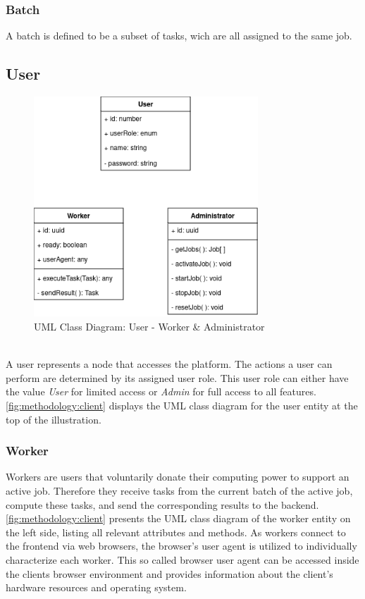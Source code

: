 \subsubsection{Batch}
\label{ssubsec:methodology:entities:task:batch}
A batch is defined to be a subset of tasks, wich are all assigned to the same job.

\subsection{User}
\label{subsec:methodology:entities:client}
\begin{figure}[htbp]
  \centering
  \includegraphics[width=0.75\textwidth]{gfx/figures/Client.png}
  \caption{\acs{UML} Class Diagram: User - Worker \& Administrator}
  \label{fig:methodology:client}
\end{figure}
~\\
A user represents a node that accesses the platform. The actions a user can perform are determined by its assigned user role. This user role can either have the value \emph{User} for limited access or \emph{Admin} for full access to all features. \autoref{fig:methodology:client} displays the \ac{UML} class diagram for the user entity at the top of the illustration.

\subsubsection{Worker}
\label{ssubsec:methodology:entities:client:worker}
Workers are users that voluntarily donate their computing power to support an active job. Therefore they receive tasks from the current batch of the active job, compute these tasks, and send the corresponding results to the backend. \autoref{fig:methodology:client} presents the \ac{UML} class diagram of the worker entity on the left side, listing all relevant attributes and methods. As workers connect to the frontend via web browsers, the browser's user agent is utilized to individually characterize each worker. This so called browser user agent can be accessed inside the clients browser environment and provides information about the client's hardware resources and operating system.

